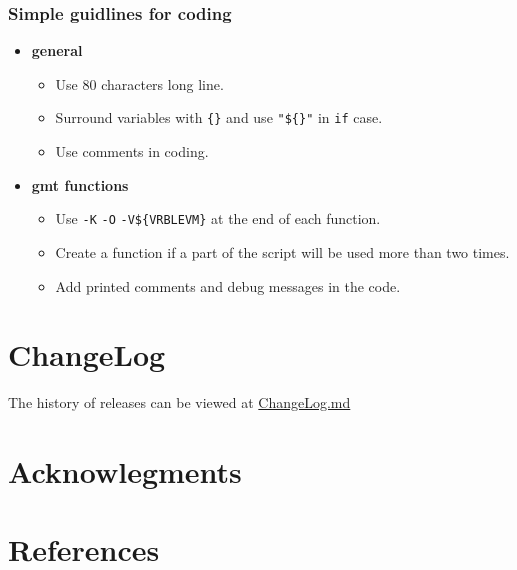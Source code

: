 \subsubsection{Simple guidlines for
coding}\label{simple-guidances-for-coding}

\begin{itemize}

\item
  \textbf{general}

  \begin{itemize}
  
  \item
    Use 80 characters long line.
  \item
    Surround variables with \texttt{\{\}} and use \texttt{"\$\{\}"} in
    \texttt{if} case.
  \item
    Use comments in coding.
  \end{itemize}
\item
  \textbf{gmt functions}

  \begin{itemize}
  
  \item
    Use \texttt{-K} \texttt{-O} \texttt{-V\$\{VRBLEVM\}} at the end of
    each function.
  \item
    Create a function if a part of the script will be used more than two
    times.
  \item
    Add printed comments and debug messages in the code.
  \end{itemize}
\end{itemize}

\section{ChangeLog}\label{changelog}

The history of releases can be viewed at
\href{docs/ChangeLog.md}{ChangeLog.md}

\section{Acknowlegments}\label{acknowlegments}

\section{References}\label{references}

